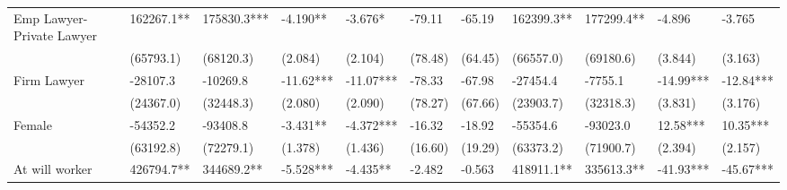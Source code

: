 \begin{tabular}{rrrrrrrrrrr}
\multicolumn{1}{l}{Emp Lawyer-Private Lawyer} & \multicolumn{1}{l}{162267.1**} & \multicolumn{1}{l}{175830.3***} & \multicolumn{1}{l}{-4.190**} & \multicolumn{1}{l}{-3.676*} & \multicolumn{1}{l}{-79.11} & \multicolumn{1}{l}{-65.19} & \multicolumn{1}{l}{162399.3**} & \multicolumn{1}{l}{177299.4**} & \multicolumn{1}{l}{-4.896} & \multicolumn{1}{l}{-3.765} \\
\multicolumn{1}{l}{} & \multicolumn{1}{l}{(65793.1)} & \multicolumn{1}{l}{(68120.3)} & \multicolumn{1}{l}{(2.084)} & \multicolumn{1}{l}{(2.104)} & \multicolumn{1}{l}{(78.48)} & \multicolumn{1}{l}{(64.45)} & \multicolumn{1}{l}{(66557.0)} & \multicolumn{1}{l}{(69180.6)} & \multicolumn{1}{l}{(3.844)} & \multicolumn{1}{l}{(3.163)} \\
\multicolumn{1}{l}{Firm Lawyer} & \multicolumn{1}{l}{-28107.3} & \multicolumn{1}{l}{-10269.8} & \multicolumn{1}{l}{-11.62***} & \multicolumn{1}{l}{-11.07***} & \multicolumn{1}{l}{-78.33} & \multicolumn{1}{l}{-67.98} & \multicolumn{1}{l}{-27454.4} & \multicolumn{1}{l}{-7755.1} & \multicolumn{1}{l}{-14.99***} & \multicolumn{1}{l}{-12.84***} \\
\multicolumn{1}{l}{} & \multicolumn{1}{l}{(24367.0)} & \multicolumn{1}{l}{(32448.3)} & \multicolumn{1}{l}{(2.080)} & \multicolumn{1}{l}{(2.090)} & \multicolumn{1}{l}{(78.27)} & \multicolumn{1}{l}{(67.66)} & \multicolumn{1}{l}{(23903.7)} & \multicolumn{1}{l}{(32318.3)} & \multicolumn{1}{l}{(3.831)} & \multicolumn{1}{l}{(3.176)} \\
\multicolumn{1}{l}{Female} & \multicolumn{1}{l}{-54352.2} & \multicolumn{1}{l}{-93408.8} & \multicolumn{1}{l}{-3.431**} & \multicolumn{1}{l}{-4.372***} & \multicolumn{1}{l}{-16.32} & \multicolumn{1}{l}{-18.92} & \multicolumn{1}{l}{-55354.6} & \multicolumn{1}{l}{-93023.0} & \multicolumn{1}{l}{12.58***} & \multicolumn{1}{l}{10.35***} \\
\multicolumn{1}{l}{} & \multicolumn{1}{l}{(63192.8)} & \multicolumn{1}{l}{(72279.1)} & \multicolumn{1}{l}{(1.378)} & \multicolumn{1}{l}{(1.436)} & \multicolumn{1}{l}{(16.60)} & \multicolumn{1}{l}{(19.29)} & \multicolumn{1}{l}{(63373.2)} & \multicolumn{1}{l}{(71900.7)} & \multicolumn{1}{l}{(2.394)} & \multicolumn{1}{l}{(2.157)} \\
\multicolumn{1}{l}{At will worker} & \multicolumn{1}{l}{426794.7**} & \multicolumn{1}{l}{344689.2**} & \multicolumn{1}{l}{-5.528***} & \multicolumn{1}{l}{-4.435**} & \multicolumn{1}{l}{-2.482} & \multicolumn{1}{l}{-0.563} & \multicolumn{1}{l}{418911.1**} & \multicolumn{1}{l}{335613.3**} & \multicolumn{1}{l}{-41.93***} & \multicolumn{1}{l}{-45.67***} \\

\end{tabular}
